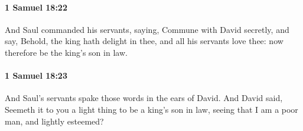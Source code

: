 		\paragraph{1 Samuel 18:22} %
			\label{1SAMUEL-18-22}

			And Saul commanded his servants, saying, Commune with David secretly, and say, Behold, the king hath delight in thee, and all his servants love thee: now therefore be the king’s son in law.


		\paragraph{1 Samuel 18:23} %
			\label{1SAMUEL-18-23}

			And Saul’s servants spake those words in the ears of David. And David said, Seemeth it to you a light thing to be a king’s son in law, seeing that I am a poor man, and lightly esteemed?


